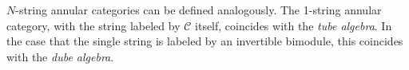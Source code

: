 \begin{definition}
	$N$-string annular categories can be defined analogously. The 1-string annular category, with the string labeled by $\mathcal{C}$ itself, coincides with the \emph{tube algebra}\cite{ocneanu}. In the case that the single string is labeled by an invertible bimodule, this coincides with the \emph{dube algebra}\cite{WBV17}. 
\end{definition}
